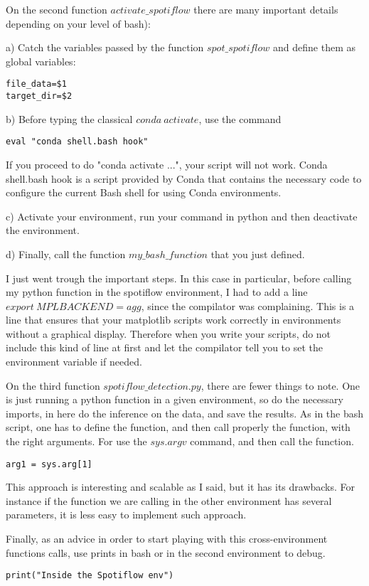 \documentclass[24pt]{article}
\begin{document}
On the second function $activate \_spotiflow$ there are many important details depending on your level of bash):

a) Catch the variables passed by the function $spot\_spotiflow$ and define them as global variables:

\begin{lstlisting}
file_data=$1
target_dir=$2
\end{lstlisting}

b) Before typing the classical 
$conda~ activate$, use the command
 
\begin{lstlisting}
eval "conda shell.bash hook"
\end{lstlisting}

If you proceed to do "conda activate ...", your script will not work.  Conda shell.bash hook is a script provided by Conda that contains the necessary code to configure the current Bash shell  for using Conda environments. 

c) Activate your environment, run your command in python and then deactivate the environment.

d) Finally, call the function $my\_bash\_function$ that you just defined.

I just went trough the important steps. In this case in particular, before calling my python function in the spotiflow environment,  I had to add a line $export~ MPLBACKEND=agg$, since the compilator was complaining. This is a line that ensures that your matplotlib scripts work correctly in environments without a graphical display. Therefore when you write your scripts, do not include this kind of line at first and let the compilator tell you to set the environment variable if needed.

On the third function $spotiflow\_detection.py$, there are fewer things to note. One is just running  a python function in a given environment, so do the  necessary imports, in here do the inference on the data, and save the results. As in the bash script, one has to define the function, and then call properly the function, with the right arguments. 
For use the $sys.argv$ command, and then call the function.

\begin{lstlisting}
arg1 = sys.arg[1]
\end{lstlisting}

This approach is interesting and scalable as I said, but it has its drawbacks. For instance if the function we are calling in the other environment has several parameters, it is less easy to implement such approach.

Finally, as an advice in order to start playing with this cross-environment  functions calls, use prints in bash or in the second environment to debug.
\begin{lstlisting}
print("Inside the Spotiflow env") 
\end{lstlisting}









\end{document}
